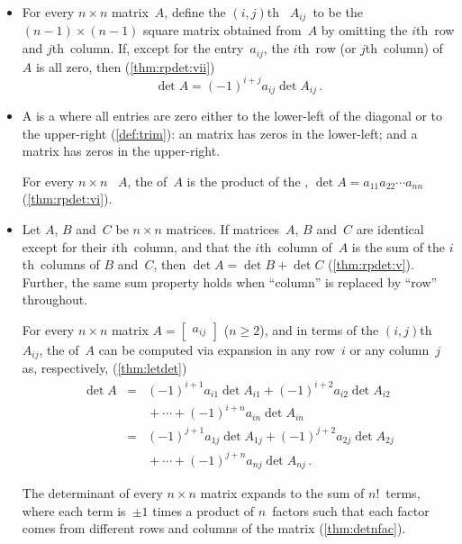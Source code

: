 \begin{itemize}
\item For every \(n\times n\) matrix~\(A\),
define the \((i,j)\)th~ \(A_{ij}\)~to be the \((n-1)\times(n-1)\) square matrix obtained from~\(A\) by omitting the \(i\)th~row and \(j\)th~column.  
If, except for the entry~\(a_{ij}\), the \(i\)th~row (or \(j\)th~column) of~\(A\) is all zero, then (\autoref{thm:rpdet:vii})
\begin{equation*}
\det A=(-1)^{i+j}a_{ij}\det A_{ij}\,.
\end{equation*}

\item A  is a  where all entries are zero either to the lower-left of the diagonal or to the upper-right (\autoref{def:trim}): an  matrix has zeros in the lower-left; and a  matrix has zeros in the upper-right.

\itemme For every \(n\times n\) ~\(A\),
the  of~\(A\) is the product of the , \(\det A=a_{11}a_{22}\cdots a_{nn}\) (\autoref{thm:rpdet:vi}).

\item Let \(A\), \(B\) and~\(C\) be \(n\times n\) matrices.
If matrices~\(A\), \(B\) and~\(C\) are identical except for their \(i\)th~column, and that the \(i\)th~column of~\(A\) is the sum of the \(i\)th~columns of \(B\) and~\(C\), then \(\det A=\det B+\det C\) (\autoref{thm:rpdet:v}).
Further, the same sum property holds when ``column'' is replaced by ``row'' throughout.

\itemme For every \(n\times n\) matrix \(A=\begin{bmatrix} a_{ij} \end{bmatrix}\) (\(n\geq2\)), and in terms of the \((i,j)\)th ~\(A_{ij}\), the  of~\(A\) can be computed via expansion in any row~\(i\) or any column~\(j\) as, respectively, (\autoref{thm:letdet})
\begin{eqnarray*}
\det A
&=&(-1)^{i+1}a_{i1}\det A_{i1}
+(-1)^{i+2}a_{i2}\det A_{i2}
\nonumber\\&&{}
+\cdots+(-1)^{i+n}a_{in}\det A_{in}
\nonumber\\&=&(-1)^{j+1}a_{1j}\det A_{1j}
+(-1)^{j+2}a_{2j}\det A_{2j}
\nonumber\\&&{}
+\cdots+(-1)^{j+n}a_{nj}\det A_{nj}\,.
\end{eqnarray*}

\itemme The determinant of every \(n\times n\) matrix expands to the sum of \(n!\)~terms, where each term is~\(\pm1\) times a product of \(n\)~factors such that each factor comes from different rows and columns of the matrix (\autoref{thm:detnfac}).



\end{itemize}



\makeanswers
